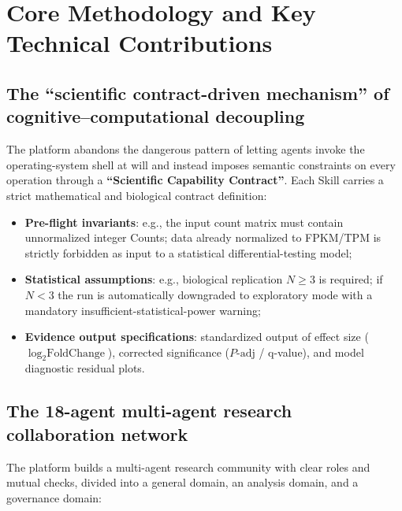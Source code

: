 \documentclass[11pt,a4paper]{article}
\begin{document}
\section{Core Methodology and Key Technical Contributions}

\subsection{The ``scientific contract-driven mechanism'' of cognitive--computational decoupling}

The platform abandons the dangerous pattern of letting agents invoke the operating-system shell at will and instead imposes semantic constraints on every operation through a \textbf{``Scientific Capability Contract''}. Each Skill carries a strict mathematical and biological contract definition:

\begin{itemize}
  \item \textbf{Pre-flight invariants}: e.g., the input count matrix must contain unnormalized integer Counts; data already normalized to FPKM/TPM is strictly forbidden as input to a statistical differential-testing model;
  \item \textbf{Statistical assumptions}: e.g., biological replication $N \ge 3$ is required; if $N < 3$ the run is automatically downgraded to exploratory mode with a mandatory insufficient-statistical-power warning;
  \item \textbf{Evidence output specifications}: standardized output of effect size ($\log_2 \text{FoldChange}$), corrected significance ($P\text{-adj}$ / q-value), and model diagnostic residual plots.
\end{itemize}

\subsection{The 18-agent multi-agent research collaboration network}

The platform builds a multi-agent research community with clear roles and mutual checks, divided into a general domain, an analysis domain, and a governance domain:
\end{document}
